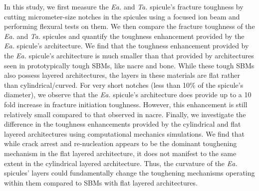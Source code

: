 \documentclass[12pt,onecolumn]{article}
\makeatletter
\newcommand{\TA}{\textit{Ta.\@}\xspace}
\newcommand{\EA}{\textit{Ea.\@}\xspace}
\makeatother
\begin{document}
\begin{bibunit}


In this study, we first measure the \EA and \TA spicule's fracture toughness by cutting micrometer-size notches in the spicules using a focused ion beam and performing flexural tests on them. 
%
%
We then compare the fracture toughness of the \EA and \TA spicules and quantify the toughness enhancement provided by the \EA spicule's architecture. We find that the toughness enhancement provided by the \EA spicule's architecture is much smaller than that provided by architectures seen in prototypically tough SBMs, like nacre and bone. While these tough SBMs also possess layered architectures, the layers in these materials are flat rather than cylindrical/curved. 
%
For very short notches (less than 10\% of the spicule's diameter), we observe that the \EA spicule's architecture does provide up to a 10 fold increase in fracture initiation toughness. However, this enhancement is still relatively small compared to that observed in nacre. 
%
Finally, we investigate the difference in the toughness enhancements provided by the cylindrical and flat layered architectures using computational mechanics simulations. 
%
%
We find that while crack arrest and re-nucleation appears to be the dominant toughening mechanism in the flat layered architecture, it does not manifest to the same extent in the cylindrical layered architecture. Thus, the curvature of the \EA spicules' layers could fundamentally change the toughening mechanisms operating within them compared to SBMs with flat layered architectures.




\end{bibunit}
\end{document}
